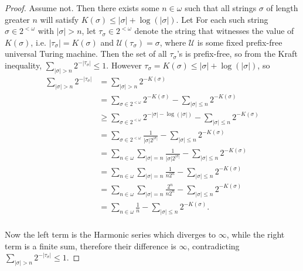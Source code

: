 \documentclass{article}
\begin{document}
\begin{enumerate}
    \begin{proof}
      Assume not. Then there exists some $n\in\omega$ such that all strings
      $\sigma$ of length greater $n$ will satisfy
      $K(\sigma)\leq|\sigma|+\log(|\sigma|)$. Let For each such string
      $\sigma\in 2^{<\omega}$ with $|\sigma|>n$, let
      $\tau_\sigma\in2^{<\omega}$ denote the string that witnesses the
      value of $K(\sigma)$, i.e.
      $|\tau_\sigma|=K(\sigma)$ and $\mathcal{U}(\tau_\sigma)=\sigma$, where
      $\mathcal{U}$ is some fixed prefix-free universal Turing machine.
      Then the set of all $\tau_\sigma$'s is prefix-free, so from
      the Kraft inequality, $\sum_{|\sigma|>n} 2^{-|\tau_\sigma|} \leq 1$.
      However $\tau_\sigma=K(\sigma) \leq |\sigma|+\log(|\sigma|)$, so
      \begin{align*}
        \sum_{|\sigma|>n} 2^{-|\tau_\sigma|} &=\sum_{|\sigma|>n}
          2^{-K(\sigma)} \\
        &=\sum_{\sigma\in 2^{<\omega}} 2^{-K(\sigma)} -\sum_{|\sigma|\leq
          n} 2^{-K(\sigma)} \\
        &\geq \sum_{\sigma\in 2^{<\omega}} 2^{-|\sigma|-\log(|\sigma|)}
          -\sum_{|\sigma|\leq n} 2^{-K(\sigma)}\\
        &=\sum_{\sigma\in 2^{<\omega}} \frac{1}{|\sigma|2^{|\sigma|}}
          -\sum_{|\sigma|\leq n} 2^{-K(\sigma)}\\
        &=\sum_{n\in\omega} \sum_{|\sigma|=n}
          \frac{1}{|\sigma|2^{|\sigma|}} -\sum_{|\sigma|\leq n}
          2^{-K(\sigma)}\\
        &=\sum_{n\in\omega} \sum_{|\sigma|=n}
          \frac{1}{n2^{n}} -\sum_{|\sigma|\leq n}
          2^{-K(\sigma)}\\
        &=\sum_{n\in\omega} \sum_{|\sigma|=n}
          \frac{2^n}{n2^{n}} -\sum_{|\sigma|\leq n}
          2^{-K(\sigma)}\\
        &=\sum_{n\in\omega} \frac{1}{n} -\sum_{|\sigma|\leq n}
          2^{-K(\sigma)}.\\
      \end{align*}

      Now the left term is the Harmonic series which diverges to $\infty$,
      while the right term is a finite sum, therefore their difference is
      $\infty$, contradicting $\sum_{|\sigma|>n} 2^{-|\tau_\sigma|} \leq
      1$.
    \end{proof}
\end{enumerate}
\end{document}

